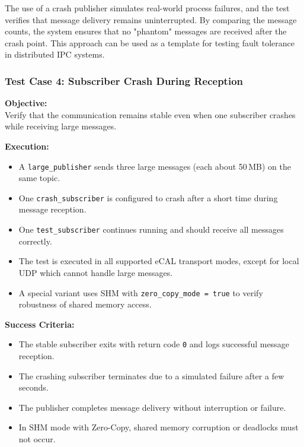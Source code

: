 \vspace{1em}

The use of a crash publisher simulates real-world process failures, and the test verifies that message delivery remains uninterrupted. By comparing the message counts, the system ensures that no "phantom" messages are received after the crash point. This approach can be used as a template for testing fault tolerance in distributed IPC systems.

\vspace{1em}
\subsubsection{Test Case 4: Subscriber Crash During Reception}

\textbf{Objective:} \\
Verify that the communication remains stable even when one subscriber crashes while receiving large messages.

\vspace{0.5em}
\textbf{Execution:}
\begin{itemize}
	\item A \texttt{large\_publisher} sends three large messages (each about 50\,MB) on the same topic.
	\item One \texttt{crash\_subscriber} is configured to crash after a short time during message reception.
	\item One \texttt{test\_subscriber} continues running and should receive all messages correctly.
	\item The test is executed in all supported eCAL transport modes, except for local UDP which cannot handle large messages.
	\item A special variant uses SHM with \texttt{zero\_copy\_mode = true} to verify robustness of shared memory access.
\end{itemize}

\textbf{Success Criteria:}
\begin{itemize}
	\item The stable subscriber exits with return code \texttt{0} and logs successful message reception.
	\item The crashing subscriber terminates due to a simulated failure after a few seconds.
	\item The publisher completes message delivery without interruption or failure.
	\item In SHM mode with Zero-Copy, shared memory corruption or deadlocks must not occur.
\end{itemize}

